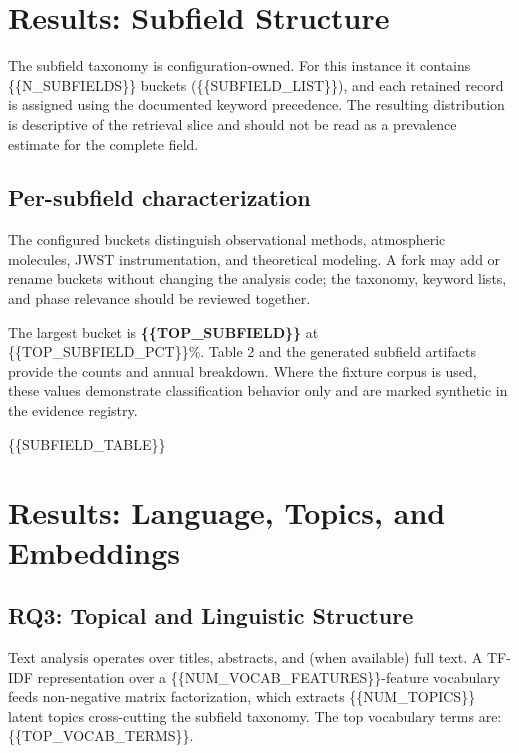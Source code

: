 \documentclass[
]{article}
\begin{document}
\newpage

\section{Results: Subfield Structure}\label{results-subfield-structure}

The subfield taxonomy is configuration-owned. For this instance it
contains \{\{N\_SUBFIELDS\}\} buckets (\{\{SUBFIELD\_LIST\}\}), and each
retained record is assigned using the documented keyword precedence. The
resulting distribution is descriptive of the retrieval slice and should
not be read as a prevalence estimate for the complete field.

\subsection{Per-subfield
characterization}\label{per-subfield-characterization}

The configured buckets distinguish observational methods, atmospheric
molecules, JWST instrumentation, and theoretical modeling. A fork may
add or rename buckets without changing the analysis code; the taxonomy,
keyword lists, and phase relevance should be reviewed together.

The largest bucket is \textbf{\{\{TOP\_SUBFIELD\}\}} at
\{\{TOP\_SUBFIELD\_PCT\}\}\%. Table 2 and the generated subfield
artifacts provide the counts and annual breakdown. Where the fixture
corpus is used, these values demonstrate classification behavior only
and are marked synthetic in the evidence registry.

\{\{SUBFIELD\_TABLE\}\}

\newpage

\section{Results: Language, Topics, and
Embeddings}\label{results-language-topics-and-embeddings}

\subsection{RQ3: Topical and Linguistic
Structure}\label{rq3-topical-and-linguistic-structure}

Text analysis operates over titles, abstracts, and (when available) full
text. A TF-IDF representation over a
\{\{NUM\_VOCAB\_FEATURES\}\}-feature vocabulary feeds non-negative
matrix factorization, which extracts \{\{NUM\_TOPICS\}\} latent topics
cross-cutting the subfield taxonomy. The top vocabulary terms are:
\{\{TOP\_VOCAB\_TERMS\}\}.
\end{document}
